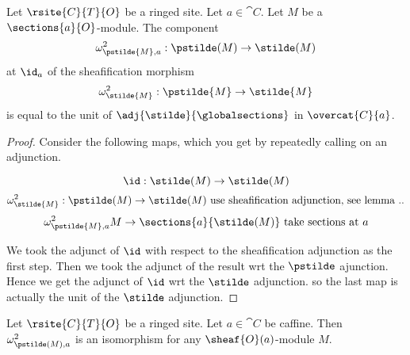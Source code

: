 \begin{lemma}
Let $\rsite{C}{T}{O}$ be a ringed site.
Let $a \in \cat{C}$.
Let $M$ be a $\sections{a}{O}$-module.
The component 
\[\omega^2_{\pstilde{M},a}: \pstilde(M) \rightarrow \stilde(M)\] 
at $\id_a$
of the sheafification morphism 
\[\omega^2_{\stilde{M}}: \pstilde{M} \rightarrow \stilde{M}\]
is equal to 
the unit of $\adj{\stilde}{\globalsections}$ 
in $\overcat{C}{a}$.
\end{lemma}

\begin{proof}
Consider the following maps, which you get by repeatedly calling on an adjunction.

\[\id :\stilde(M) \rightarrow \stilde(M)\]
\[\omega^2_{\stilde{M}} : \pstilde(M) \rightarrow \stilde(M) 
	\mbox{ use sheafification adjunction, see lemma ..}
\]
\[\omega^2_{\pstilde{M},a} M \rightarrow \sections{a}{\stilde(M)} \mbox{ take sections at $a$}\]

We took the adjunct of $\id$ with respect to the sheafification adjunction as the first step.
Then we took the adjunct of the result wrt the $\pstilde$ ajunction.
Hence we get the adjunct of $\id$ wrt the $\stilde$ adjunction.
so the last map is actually the unit of the $\stilde$ adjunction.
\end{proof}

\begin{corollary}
Let $\rsite{C}{T}{O}$ be a ringed site.
Let $a \in \cat{C}$ be caffine.
Then $\omega^2_{\pstilde(M),a}$ is an isomorphism for any $\sheaf{O}(a)$-module $M$.
\end{corollary}